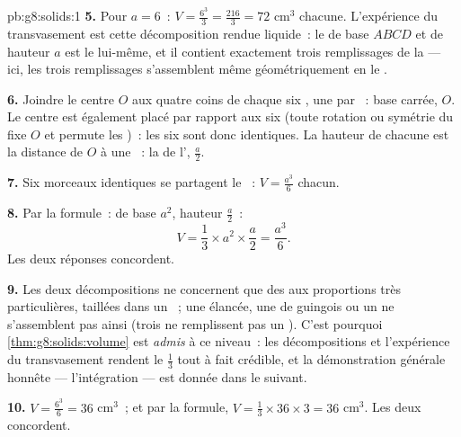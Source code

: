 \begin{solution}{pb:g8:solids:1}
\textbf{5.} Pour $a = 6$~: $V = \frac{6^3}{3} = \frac{216}{3} = 72$
cm$^3$ chacune. L'expérience du transvasement est cette
décomposition rendue liquide~: le  de base $ABCD$ et de
hauteur $a$ est le  lui-même, et il contient exactement trois
remplissages de la  --- ici, les trois remplissages
s'assemblent même géométriquement en le .

\textbf{6.} Joindre le centre $O$ aux quatre coins de chaque 
 six , une par ~: base carrée,  $O$. Le
centre est également placé par rapport aux six  (toute rotation
ou symétrie du  fixe $O$ et permute les )~: les six
 sont donc identiques. La hauteur de chacune est la
distance de $O$ à une ~: la  de l', $\frac{a}{2}$.

\textbf{7.} Six morceaux identiques se partagent le ~:
$V = \frac{a^3}{6}$ chacun.

\textbf{8.} Par la formule~:  de base $a^2$, hauteur
$\frac a2$~:
\[
V = \frac13 \times a^2 \times \frac{a}{2} = \frac{a^3}{6} .
\]
Les deux réponses concordent.

\textbf{9.} Les deux décompositions ne concernent que des 
aux proportions très particulières, taillées dans un ~; une
 élancée, une  de guingois ou un  ne s'assemblent
pas ainsi (trois  ne remplissent pas un ). C'est
pourquoi \cref{thm:g8:solids:volume} est \emph{admis} à ce niveau~:
les décompositions et l'expérience du transvasement rendent le
$\frac13$ tout à fait crédible, et la démonstration générale honnête
--- l'intégration --- est donnée dans le  suivant.

\textbf{10.} $V = \frac{6^3}{6} = 36$ cm$^3$~; et par la formule,
$V = \frac13 \times 36 \times 3 = 36$ cm$^3$. Les deux concordent.


\end{solution}
